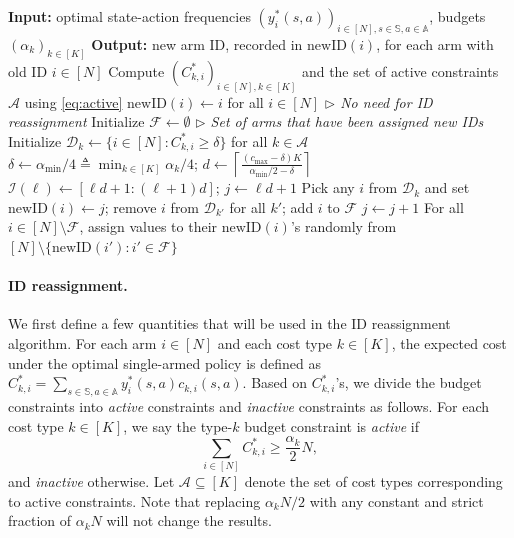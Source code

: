 \documentclass{article}
\theoremstyle{plain}
\theoremstyle{remark}
\newcommand{\sspa}{\mathbb{S}}
\newcommand{\aspa}{\mathbb{A}}
\newcommand{\newID}{\text{newID}}
\newcommand{\costIDreassign}{\delta} %
\newcommand{\gsizeIDreassign}{d} %
\newcommand{\cA}{\mathcal{A}}
\newcommand{\cF}{\mathcal{F}}
\newcommand{\cI}{\mathcal{I}}
\newcommand{\cD}{\mathcal{D}}
\begin{document}
\begin{algorithm}[t]
     \caption{ID reassignment}\label{alg:id-assign}
     \begin{algorithmic}[1]
        \STATE \textbf{Input:} optimal state-action frequencies $(y^*_i(s,a))_{i\in [N], s\in\sspa,a\in\aspa}$, budgets $(\alpha_k)_{k\in[K]}$
        \STATE \textbf{Output:} new arm ID, recorded in $\newID(i)$, for each arm with old ID $i\in[N]$
        \STATE Compute $(C_{k,i}^*)_{i\in[N],k\in[K]}$ and the set of active constraints $\cA$ using \eqref{eq:active}
        \IF{$\cA=\emptyset$}
        \STATE $\newID(i)\gets i$ for all $i\in[N]$  \hfill \emph{$\triangleright$ No need for ID reassignment}
        \ELSE 
        \STATE Initialize $\cF \gets \emptyset$ \hfill\emph{$\triangleright$ Set of arms that have been assigned new IDs}
        \STATE Initialize $\cD_k\gets\{i\in[N]\colon C_{k,i}^*\ge \costIDreassign\}$ for all $k\in\cA$\\
        \STATE $\costIDreassign\gets \alpha_{\min}/4\triangleq\min_{k\in[K]}\alpha_k/4$;\;
        $\gsizeIDreassign \gets \left\lceil \frac{(c_{\max}-\costIDreassign)K}{\alpha_{\min}/2-\costIDreassign}\right\rceil$
        \FOR{$\ell =0,1,\dots,\lfloor N/\gsizeIDreassign\rfloor-1$}
        \STATE $\cI(\ell) \gets [\ell\gsizeIDreassign+1:(\ell+1)\gsizeIDreassign]$;\; $j\gets \ell\gsizeIDreassign+1$
        \FOR{$k\in\cA$}\label{alg:line:reassign-start}
            \IF{$\sum_{i\in \cF}C_{k,i}^*\mathbbm{1}\{\newID(i)\in \cI(\ell)\}<\costIDreassign$}
            \STATE Pick any $i$ from $\cD_k$ and set $\newID(i)\gets j$; remove $i$ from $\cD_{k'}$ for all $k'$; add $i$ to $\cF$
            \STATE $j\gets j+1$
            \ENDIF
        \ENDFOR\label{alg:line:reassign-end}
        \ENDFOR
        \STATE For all $i\in [N]\setminus \cF$, assign values to their $\newID(i)$'s randomly from $[N]\setminus \{\newID(i')\colon i'\in \cF\}$
        \ENDIF
     \end{algorithmic}
\end{algorithm}
\paragraph{ID reassignment.}
We first define a few quantities that will be used in the ID reassignment algorithm.
For each arm $i\in[N]$ and each cost type $k\in[K]$, the expected cost under the optimal single-armed policy is defined as $C_{k,i}^* =\sum_{s\in\sspa,a\in\aspa}y_i^*(s,a)c_{k,i}(s,a)$.
Based on $C_{k,i}^*$'s, we divide the budget constraints into \emph{active} constraints and \emph{inactive} constraints as follows.
For each cost type $k\in[K]$, we say the type-$k$ budget constraint is \emph{active} if
\begin{equation}\label{eq:active}
    \sum_{i\in[N]}C_{k,i}^*\ge \frac{\alpha_k}{2}N,
\end{equation}
and \emph{inactive} otherwise.
Let $\cA\subseteq [K]$ denote the set of cost types corresponding to active constraints.
Note that replacing $\alpha_k N/2$ with any constant and strict fraction of $\alpha_k N$ will not change the results.
\end{document}
